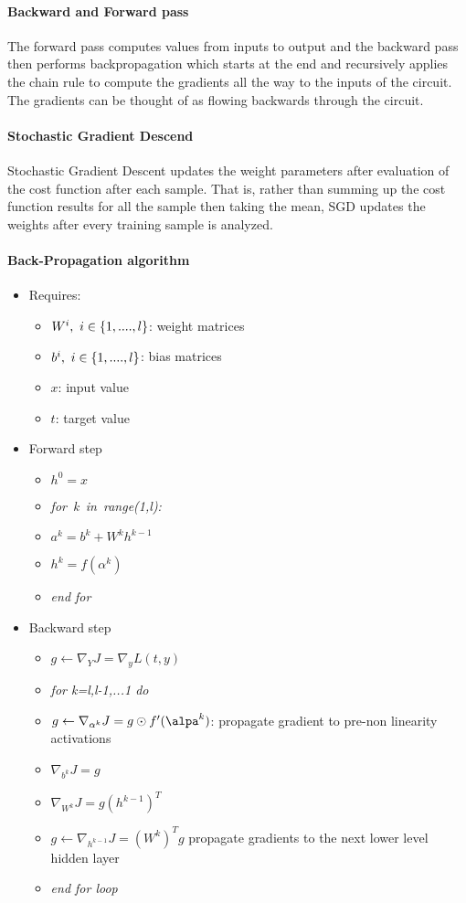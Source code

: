 \paragraph{Backward and Forward pass}
The forward pass computes values from inputs to output and the backward pass then performs backpropagation which starts at the end and recursively applies the chain rule to compute the gradients all the way to the inputs of the circuit. The gradients can be thought of as flowing backwards through the circuit.


\paragraph{Stochastic Gradient Descend}
Stochastic Gradient Descent updates the weight parameters after evaluation of the cost function after each sample.  That is, rather than summing up the cost function results for all the sample then taking the mean, SGD updates the weights after every training sample is analyzed.

\paragraph{Back-Propagation algorithm}
\begin{itemize}
\item Requires:
	\begin{itemize}
	\item $W^i,\ i\in \lbrace{1,....,l}\rbrace$: weight matrices
	\item $b^i,\ i\in \lbrace{1,....,l}\rbrace$: bias matrices
	\item $x$: input value
	\item $t$: target value
	\end{itemize}
\item Forward step

\begin{itemize}
\item $h^0=x$
\item \textit{for\ k\ in\ range(1,l):}
\item $a^k=b^k+W^kh^{k-1}$
\item $h^k=f(\alpha^k)$
\item \textit{end for}
\end{itemize}

\item Backward step

\begin{itemize}
	\item $g \leftarrow \nabla_YJ=\nabla_yL(t,y)$
	\item \textit{for k=l,l-1,...1 do}
	\item $g \leftarrow \nabla_{\alpha^k}J=g \odot f'(\alpa^k)$: propagate gradient to pre-non linearity activations
	\item $\nabla_{b^k}J=g$
	\item $\nabla_{W^k}J=g(h^{k-1})^T$
	\item $g \leftarrow \nabla_{h^{k-1}}J=(W^k)^Tg$ propagate gradients to the next lower level hidden layer
	\item \textit{end for loop}
\end{itemize}

\end{itemize}
